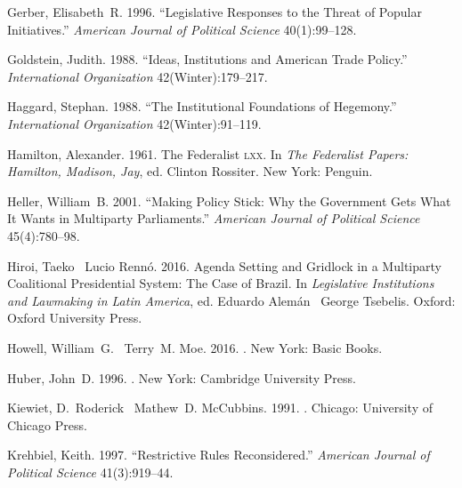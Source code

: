 \documentclass[letter,12pt]{article}
\begin{document}
\begin{thebibliography}{xx}
Gerber, Elisabeth~R. 1996.
\newblock ``Legislative Responses to the Threat of Popular Initiatives.'' {\em
  American Journal of Political Science} 40(1):99--128.

Goldstein, Judith. 1988.
\newblock ``Ideas, Institutions and American Trade Policy.'' {\em International
  Organization} 42(Winter):179--217.

Haggard, Stephan. 1988.
\newblock ``The Institutional Foundations of Hegemony.'' {\em International
  Organization} 42(Winter):91--119.

Hamilton, Alexander. 1961.
\newblock The Federalist \textsc{lxx}.  In {\em The Federalist Papers:
  Hamilton, Madison, Jay}, ed. Clinton Rossiter.
\newblock New York:  Penguin.

Heller, William~B. 2001.
\newblock ``Making Policy Stick: Why the Government Gets What It Wants in
  Multiparty Parliaments.'' {\em American Journal of Political Science}
  45(4):780--98.

Hiroi, Taeko \harvardand\ Lucio Renn\'o. 2016.
\newblock Agenda Setting and Gridlock in a Multiparty Coalitional Presidential
  System: The Case of Brazil.  In {\em Legislative Institutions and Lawmaking
  in Latin America}, ed. Eduardo Alem\'an \harvardand\ George Tsebelis.
\newblock Oxford:  Oxford University Press.

Howell, William~G. \harvardand\ Terry~M. Moe. 2016.
.
\newblock New York:  Basic Books.

Huber, John~D. 1996.
.
\newblock New York:  Cambridge University Press.

Kiewiet, D.~Roderick \harvardand\ Mathew~D. McCubbins. 1991.
.
\newblock Chicago:  University of Chicago Press.

Krehbiel, Keith. 1997.
\newblock ``Restrictive Rules Reconsidered.'' {\em American Journal of
  Political Science} 41(3):919--44.


\end{thebibliography}
\end{document}
